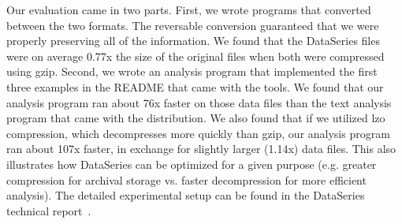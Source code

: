 \documentclass{acm_proc_article-sp}
\begin{document}
Our evaluation came in two parts.  First, we wrote programs that
converted between the two formats.  The reversable conversion
guaranteed that we were properly preserving all of the information.
We found that the DataSeries files were on average 0.77x the size of
the original files when both were compressed using gzip.  Second, we
wrote an analysis program that implemented the first three examples in
the README that came with the tools.  We found that our analysis
program ran about 76x faster on those data files than the text
analysis program that came with the distribution.  We also found that
if we utilized lzo compression, which decompresses more quickly than
gzip, our analysis program ran about 107x faster, in exchange for
slightly larger (1.14x) data files.  This also illustrates how
DataSeries can be optimized for a given purpose (e.g. greater
compression for archival storage vs. faster decompression for more
efficient analysis). The detailed experimental setup can be found in
the DataSeries technical report~\cite{DSTechnicalReportSnapshot}.


%
\end{document}
